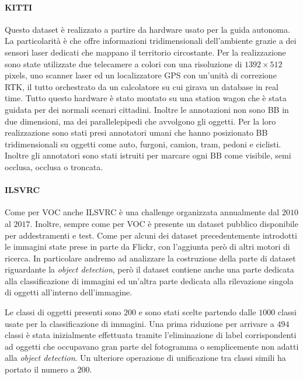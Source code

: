 \paragraph{KITTI}  \cite{geiger2012we} Questo dataset è realizzato a partire da hardware usato per la guida autonoma. La particolarità è che offre informazioni tridimensionali dell'ambiente grazie a dei sensori laser dedicati che mappano il territorio circostante. Per la realizzazione sono state  utilizzate due telecamere a colori con una risoluzione di $1392 \times 512$ pixels, uno scanner laser ed un localizzatore GPS con un'unità di correzione RTK, il tutto orchestrato da un calcolatore su cui girava un database in real time.  Tutto questo hardware è stato montato su una station wagon che è stata guidata per dei normali scenari cittadini. 
Inoltre le annotazioni non sono \ac{BB} in due dimensioni, ma dei parallelepipedi che avvolgono gli oggetti. Per la loro realizzazione sono stati presi annotatori umani che hanno posizionato \ac{BB} tridimensionali su oggetti come auto, furgoni, camion, tram, pedoni e ciclisti. Inoltre gli annotatori sono stati istruiti per marcare ogni \ac{BB} come visibile, semi occlusa, occlusa o troncata. 



\paragraph{ILSVRC}
Come per \ac{VOC} anche \ac{ILSVRC} \cite{russakovsky2015imagenet} è una challenge organizzata annualmente dal $2010$ al $2017$. Inoltre, sempre come per \ac{VOC} è presente un dataset pubblico disponibile per addestramenti e test. 
Come per alcuni dei dataset precedentemente introdotti le immagini state prese in parte da Flickr, con l'aggiunta però di altri motori di ricerca. In particolare andremo ad analizzare la costruzione della parte di dataset riguardante la \textit{object detection}, però il dataset contiene anche una parte dedicata alla classificazione di immagini ed un'altra parte dedicata alla rilevazione singola di oggetti all'interno dell'immagine. 

Le classi di oggetti presenti sono $200$ e sono stati scelte partendo dalle $1000$ classi usate per la classificazione di immagini. Una prima riduzione per arrivare a $494$ classi è stata inizialmente effettuata tramite l'eliminazione di label corrispondenti ad oggetti che occupavano gran parte del fotogramma o semplicemente non adatti alla \textit{object detection}. Un ulteriore operazione di unificazione tra classi simili ha portato il numero a $200$. 

